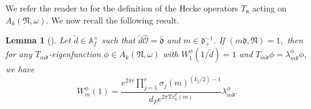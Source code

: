 \documentclass[reqno]{amsart}
\theoremstyle{plain}
\newtheorem{lemma}[theorem]{Lemma}
\theoremstyle{definition}
\theoremstyle{remark}
\def\A{\mathbbm A}
\def\A{\mathbb A}
\begin{document}
We refer the reader to  \cite[Section 4.3]{KL} for the definition of the Hecke operators $T_{\mathfrak{n}}$ acting on $A_k (\mathfrak{N}, \omega)$.
 We now recall the following result.


\begin{lemma}[{{\cite[Cor.\ 4.8]{KL}}}]\label{Fourier-Coefficient-formula}
Let $\tilde{d}\in \A^\times_{f}$ such that $\tilde{d} \hat{\mathcal{O}}=\hat{\mathfrak{d}}$ and $m\in \mathfrak{d}^{-1}_+$. If $(m\mathfrak{d},\mathfrak{N} )=1,$ then for any $T_{m\mathfrak{d}}$-eigenfunction $\phi\in A_k(\mathfrak{N},\omega)$ with $W_1^\phi(1/\tilde{d})=1$  and $T_{m\mathfrak{d}}\phi=\lambda^\phi_{m\mathfrak{d}} \phi,$ we have
$$ W_m^\phi(1)=\frac{e^{2\pi r} \prod_{j=1}^r   \sigma_j(m)^{(k_j/2)-1}    }{d_Fe^{2\pi \mathrm{Tr}_{\mathbb{Q}}^F (m)}}\lambda^\phi_{m\mathfrak{d}}.$$ 
 \end{lemma}
 
\end{document}

